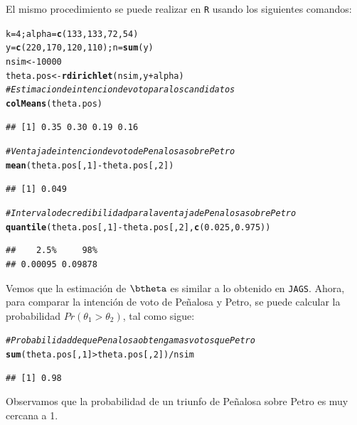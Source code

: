 \documentclass[10pt,openright]{book}\usepackage[]{graphicx}\usepackage[]{color}
\makeatletter
\newcommand{\hlnum}[1]{\textcolor[rgb]{0.686,0.059,0.569}{#1}}%
\newcommand{\hlcom}[1]{\textcolor[rgb]{0.678,0.584,0.686}{\textit{#1}}}%
\newcommand{\hlopt}[1]{\textcolor[rgb]{0,0,0}{#1}}%
\newcommand{\hlstd}[1]{\textcolor[rgb]{0.345,0.345,0.345}{#1}}%
\newcommand{\hlkwb}[1]{\textcolor[rgb]{0.69,0.353,0.396}{#1}}%
\newcommand{\hlkwd}[1]{\textcolor[rgb]{0.737,0.353,0.396}{\textbf{#1}}}%
\newenvironment{kframe}{%
 \def\at@end@of@kframe{}%
 \ifinner\ifhmode%
  \def\at@end@of@kframe{\end{minipage}}%
  \begin{minipage}{\columnwidth}%
 \fi\fi%
 \def\FrameCommand##1{\hskip\@totalleftmargin \hskip-\fboxsep
 \colorbox{shadecolor}{##1}\hskip-\fboxsep
     \hskip-\linewidth \hskip-\@totalleftmargin \hskip\columnwidth}%
 \MakeFramed {\advance\hsize-\width
   \@totalleftmargin\z@ \linewidth\hsize
   \@setminipage}}%
 {\par\unskip\endMakeFramed%
 \at@end@of@kframe}
\newenvironment{knitrout}{}{} %
\makeatother
\begin{document}
\begin{Eje}
El mismo procedimiento se puede realizar en \verb'R' usando los siguientes comandos:

\begin{knitrout}
\color{fgcolor}\begin{kframe}
\begin{alltt}
\hlstd{k}\hlkwb{=}\hlnum{4}\hlstd{; alpha}\hlkwb{=}\hlkwd{c}\hlstd{(}\hlnum{133}\hlstd{,}\hlnum{133}\hlstd{,}\hlnum{72}\hlstd{,}\hlnum{54}\hlstd{)}
\hlstd{y}\hlkwb{=}\hlkwd{c}\hlstd{(}\hlnum{220}\hlstd{,}\hlnum{170}\hlstd{,}\hlnum{120}\hlstd{,}\hlnum{110}\hlstd{); n}\hlkwb{=}\hlkwd{sum}\hlstd{(y)}
\hlstd{nsim} \hlkwb{<-} \hlnum{10000}
\hlstd{theta.pos} \hlkwb{<-} \hlkwd{rdirichlet}\hlstd{(nsim, y}\hlopt{+}\hlstd{alpha)}
\hlcom{# Estimacion de intencion de voto para los candidatos}
\hlkwd{colMeans}\hlstd{(theta.pos)}
\end{alltt}
\begin{verbatim}
## [1] 0.35 0.30 0.19 0.16
\end{verbatim}
\begin{alltt}
\hlcom{# Ventaja de intencion de voto de Penalosa sobre Petro}
\hlkwd{mean}\hlstd{(theta.pos[,}\hlnum{1}\hlstd{]}\hlopt{-}\hlstd{theta.pos[,}\hlnum{2}\hlstd{])}
\end{alltt}
\begin{verbatim}
## [1] 0.049
\end{verbatim}
\begin{alltt}
\hlcom{# Intervalo de credibilidad para la ventaja de  Penalosa sobre Petro}
\hlkwd{quantile}\hlstd{(theta.pos[,}\hlnum{1}\hlstd{]}\hlopt{-}\hlstd{theta.pos[,}\hlnum{2}\hlstd{],} \hlkwd{c}\hlstd{(}\hlnum{0.025}\hlstd{,}\hlnum{0.975}\hlstd{))}
\end{alltt}
\begin{verbatim}
##    2.5%     98% 
## 0.00095 0.09878
\end{verbatim}
\end{kframe}
\end{knitrout}
Vemos que la estimaci\'on de $\btheta$ es similar a lo obtenido en \verb'JAGS'. Ahora, para comparar la intenci\'on de voto de Pe\~nalosa y Petro, se puede calcular la probabilidad $Pr(\theta_1 > \theta_2)$, tal como sigue:
\begin{knitrout}
\color{fgcolor}\begin{kframe}
\begin{alltt}
\hlcom{# Probabilidad de que Penalosa obtenga mas votos que Petro}
\hlkwd{sum}\hlstd{(theta.pos[,}\hlnum{1}\hlstd{]}\hlopt{>}\hlstd{theta.pos[,}\hlnum{2}\hlstd{])}\hlopt{/}\hlstd{nsim}
\end{alltt}
\begin{verbatim}
## [1] 0.98
\end{verbatim}
\end{kframe}
\end{knitrout}
Observamos que la probabilidad de un triunfo de Pe\~nalosa sobre Petro es muy cercana a 1. 
\end{Eje}
                                                    
\end{document}
